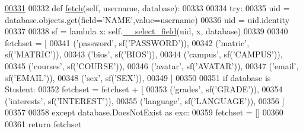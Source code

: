 \begin{DoxyCode}
\hypertarget{classProfile_1_1ProfileUnit_1_1PersProfile_l00331}{}\hyperlink{classProfile_1_1ProfileUnit_1_1PersProfile_aca301abc09bc12a7cf0a61437f941a8a}{00331} 
00332     \textcolor{keyword}{def }\hyperlink{classProfile_1_1ProfileUnit_1_1PersProfile_aca301abc09bc12a7cf0a61437f941a8a}{fetch}(self, username, database):
00333 
00334         \textcolor{keywordflow}{try}:
00335             uid = database.objects.get(field=\textcolor{stringliteral}{'NAME'},value=username)
00336             uid = uid.identity
00337 
00338             sf = \textcolor{keyword}{lambda} x: self.\hyperlink{classProfile_1_1ProfileUnit_1_1PersProfile_a48bc2c04d89772752559fc19dc79f321}{\_\_select\_field}(uid, x, database)
00339 
00340             fetchset = [
00341                     (\textcolor{stringliteral}{'password'},    sf(\textcolor{stringliteral}{'PASSWORD'})),
00342                     (\textcolor{stringliteral}{'matric'},      sf(\textcolor{stringliteral}{'MATRIC'})),
00343                     (\textcolor{stringliteral}{'bios'},        sf(\textcolor{stringliteral}{'BIOS'})),
00344                     (\textcolor{stringliteral}{'campus'},      sf(\textcolor{stringliteral}{'CAMPUS'})),
00345                     (\textcolor{stringliteral}{'courses'},     sf(\textcolor{stringliteral}{'COURSE'})),
00346                     (\textcolor{stringliteral}{'avatar'},      sf(\textcolor{stringliteral}{'AVATAR'})),
00347                     (\textcolor{stringliteral}{'email'},       sf(\textcolor{stringliteral}{'EMAIL'})),
00348                     (\textcolor{stringliteral}{'sex'},         sf(\textcolor{stringliteral}{'SEX'})),
00349             ]
00350 
00351             \textcolor{keywordflow}{if} database \textcolor{keywordflow}{is} Student:
00352                 fetchset = fetchset + [     
00353                     (\textcolor{stringliteral}{'grades'},      sf(\textcolor{stringliteral}{'GRADE'})),
00354                     (\textcolor{stringliteral}{'interests'},   sf(\textcolor{stringliteral}{'INTEREST'})),
00355                     (\textcolor{stringliteral}{'language'},    sf(\textcolor{stringliteral}{'LANGUAGE'})),
00356                 ]
00357 
00358         \textcolor{keywordflow}{except} database.DoesNotExist \textcolor{keyword}{as} exc:
00359             fetchset = []
00360 
00361         \textcolor{keywordflow}{return} fetchset

\end{DoxyCode}
